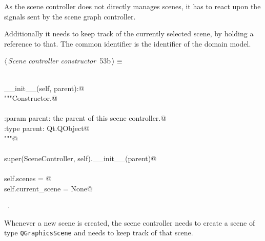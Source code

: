 \documentclass[
    a4paper,      %
    10pt,         %
    openright,    %
    notitlepage,  %
    parskip=half, %
]{scrreprt}       %
\theoremstyle{definition}                    %
\begin{document}
As the scene controller does not directly manages scenes, it has to react upon
the signals sent by the scene graph controller.

Additionally it needs to keep track of the currently selected scene, by holding
a reference to that. The common identifier is the identifier of the domain
model.

\begin{flushleft} \small
\begin{minipage}{\linewidth}\label{scrap83}\raggedright\small
{} $\langle\,${\itshape Scene controller constructor}\nobreak\ {\footnotesize {53b}}$\,\rangle\equiv$
\vspace{-1exm}
\begin{list}{}{} \item
\mbox{}\lstinline@@\\
\mbox{}\lstinline@def __init__(self, parent):@\\
\mbox{}\lstinline@    """Constructor.@\\
\mbox{}\lstinline@@\\
\mbox{}\lstinline@    :param parent: the parent of this scene controller.@\\
\mbox{}\lstinline@    :type parent: Qt.QObject@\\
\mbox{}\lstinline@    """@\\
\mbox{}\lstinline@@\\
\mbox{}\lstinline@    super(SceneController, self).__init__(parent)@\\
\mbox{}\lstinline@@\\
\mbox{}\lstinline@    self.scenes = {}@\\
\mbox{}\lstinline@    self.current_scene = None@\\
\mbox{}\lstinline@@{\NWsep}
\end{list}
\vspace{-1.5ex}
\footnotesize
\begin{list}{}{\setlength{\itemsep}{-\parsep}\setlength{\itemindent}{-\leftmargin}}
\item \NWtxtMacroRefIn\ .

\item{}
\end{list}
\end{minipage}\vspace{4ex}
\end{flushleft}
Whenever a new scene is created, the scene controller needs to create a scene of
type \verb+QGraphicsScene+ and needs to keep track of that scene.
\end{document}

